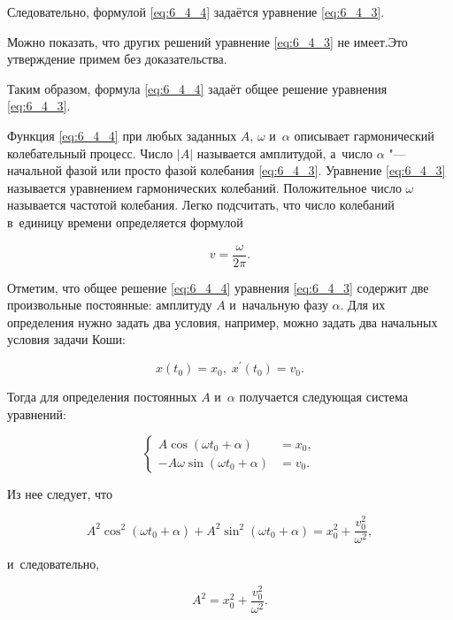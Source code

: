 Следовательно, формулой \eqref{eq:6_4_4} задаётся уравнение \eqref{eq:6_4_3}.

Можно показать, что других решений уравнение \eqref{eq:6_4_3} не имеет.Это утверждение
примем без доказательства.

Таким образом, формула \eqref{eq:6_4_4} задаёт общее решение уравнения \eqref{eq:6_4_3}.

Функция \eqref{eq:6_4_4} при любых заданных $A$, $\omega$ и~$\alpha$ описывает
гармонический колебательный процесс. Число $|A|$  называется амплитудой,
а~число $\alpha$ "--- начальной фазой или просто фазой колебания \eqref{eq:6_4_3}.
Уравнение \eqref{eq:6_4_3} называется уравнением гармонических колебаний.
Положительное число $\omega$ называется частотой колебания. Легко подсчитать,
что число колебаний в~единицу времени определяется формулой

\begin{equation*}
v = \dfrac{\omega}{2\pi}.
\end{equation*}

Отметим, что общее решение \eqref{eq:6_4_4} уравнения \eqref{eq:6_4_3} содержит
две произвольные постоянные: амплитуду $A$ и~начальную фазу $\alpha$. 
Для их определения нужно задать два условия, например, можно задать два начальных
условия задачи Коши:

\begin{equation}\label{eq:6_4_5}
x(t_{0}) = x_{0}, \; x^{\prime} (t_{0}) = v_{0}.
\end{equation}

\noindent
Тогда для определения постоянных $A$ и~$\alpha$ получается
следующая система уравнений:

\begin{equation}\label{eq:6_4_6}
\begin{cases}
A \cos (\omega t_{0} + \alpha) &= x_{0}, \\
-A \omega \sin (\omega t_{0} + \alpha) &= v_{0}.
\end{cases}
\end{equation}

\noindent
Из нее следует, что

\begin{equation*}
A^{2} \cos^{2} (\omega t_{0} + \alpha) + 
A^{2} \sin^{2} (\omega t_{0} + \alpha) = 
x^{2}_{0} + \dfrac{v^{2}_{0}}{\omega^{2}},
\end{equation*}

\noindent
и~следовательно,

\begin{equation*}
A^{2} = x^{2}_{0} + \dfrac{v^{2}_{0}}{\omega^{2}}.
\end{equation*}

